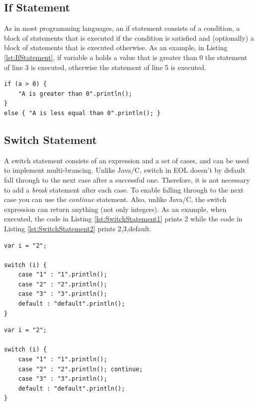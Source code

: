 \subsection{If Statement}

As in most programming languages, an if statement consists of a condition, a block of statements that is executed if the condition is satisfied and (optionally) a block of statements that is executed otherwise. As an example, in Listing \ref{lst:IfStatement}, if variable a holds a value that is greater than 0 the statement of line 3 is executed, otherwise the statement of line 5 is executed.

\begin{lstlisting}[float=h, caption=Example illustrating an if statement, label=lst:IfStatement, language=EOL]
if (a > 0) {
	"A is greater than 0".println();
}
else { "A is less equal than 0".println(); }
\end{lstlisting}

\subsection{Switch Statement}

A switch statement consists of an expression and a set of cases, and can be used to implement multi-brancing. Unlike Java/C, switch in EOL doesn't by default fall through to the next case after a successful one. Therefore, it is not necessary to add a \emph{break} statement after each case. To enable falling through to the next case you can use the \emph{continue} statement. Also, unlike Java/C, the switch expression can return anything (not only integers). As an example, when executed, the code in Listing \ref{lst:SwitchStatement1} prints 2 while the code in Listing \ref{lst:SwitchStatement2} prints 2,3,default.

\begin{lstlisting}[float=h, caption=Example illustrating a switch statement, label=lst:SwitchStatement1, language=EOL]
var i = "2";

switch (i) {
	case "1" : "1".println(); 
	case "2" : "2".println();
	case "3" : "3".println();
	default : "default".println(); 
}
\end{lstlisting}

\begin{lstlisting}[float=h, caption=Example illustrating falling through cases in a switch statement, label=lst:SwitchStatement2, language=EOL]
var i = "2";

switch (i) {
	case "1" : "1".println(); 
	case "2" : "2".println(); continue;
	case "3" : "3".println();
	default : "default".println(); 
}
\end{lstlisting}

